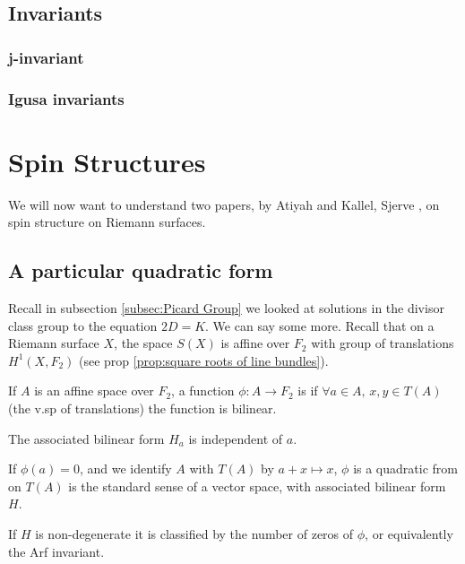 \documentclass{article}
\begin{document}
\subsection{Invariants}
\subsubsection{j-invariant}
\subsubsection{Igusa invariants}

\section{Spin Structures}
We will now want to understand two papers, by Atiyah \cite{Atiyah1971} and Kallel, Sjerve \cite{Kallel2006}, on spin structure on Riemann surfaces. 
\subsection{A particular quadratic form}
Recall in subsection \ref{subsec:Picard Group} we looked at solutions in the divisor class group to the equation $2D=K$. We can say some more. Recall that on a Riemann surface $X$, the space $S(X)$ is affine over $F_2$ with group of translations $H^1(X,F_2)$ (see prop \ref{prop:square roots of line bundles}). 
\begin{definition}
	If $A$ is an affine space over $F_2$, a function $\phi:A \to F_2$ is  if $\forall a \in A, \, x,y \in T(A)$ (the v.sp of translations) the function 
is bilinear. 
\end{definition} 

\begin{lemma}
	The associated bilinear form $H_a$ is independent of $a$. 
\end{lemma}	
If $\phi(a)=0$, and we identify $A$ with $T(A)$ by $a+x \mapsto x$, $\phi$ is a quadratic from on $T(A)$ is the standard sense of a vector space, with associated bilinear form $H$. 
\begin{lemma}
If $H$ is non-degenerate it is classified by the number of zeros of $\phi$, or equivalently the Arf invariant. 
\end{lemma}
\end{document}
